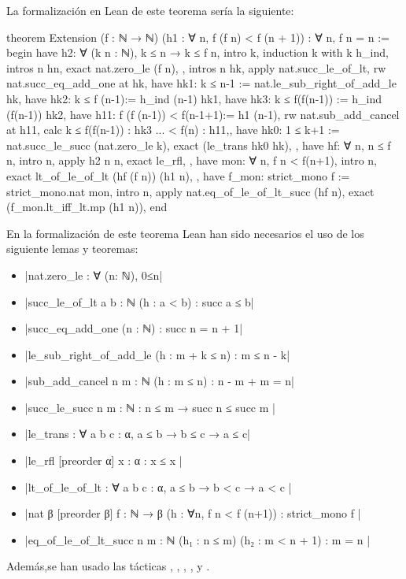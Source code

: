 La formalización en Lean de este teorema sería la siguiente:
\begin{leancode}
theorem Extension
  (f : ℕ → ℕ)
  (h1 : ∀ n, f (f n) < f (n + 1))
  : ∀ n, f n = n :=
begin
  have h2: ∀ (k n : ℕ), k ≤ n → k ≤ f n,
  { intro k,
     induction k with k h_ind,
     { intros n hn,
       exact nat.zero_le (f n), },
     { intros n hk,
       apply nat.succ_le_of_lt,
       rw nat.succ_eq_add_one at hk,
       have hk1: k ≤ n-1 := nat.le_sub_right_of_add_le hk,
       have hk2: k ≤ f (n-1):= h_ind (n-1) hk1,
       have hk3: k ≤ f(f(n-1)) := h_ind (f(n-1)) hk2,
       have h11: f (f (n-1)) < f(n-1+1):= h1 (n-1),
       rw nat.sub_add_cancel at h11,
       { calc k ≤ f(f(n-1)) : hk3
            ... < f(n)      : h11,},
       have hk0: 1 ≤ k+1 := nat.succ_le_succ (nat.zero_le k),
       exact (le_trans hk0 hk), }},
  have hf: ∀ n, n ≤ f n,
    { intro n,
      apply h2 n n,
      exact le_rfl, },
  have mon: ∀ n, f n < f(n+1),
    { intro n,
      exact lt_of_le_of_lt (hf (f n)) (h1 n), },
  have f_mon: strict_mono f := strict_mono.nat mon,
  intro n,
  apply nat.eq_of_le_of_lt_succ (hf n),
  exact (f_mon.lt_iff_lt.mp (h1 n)),
end
\end{leancode}

En la formalización de este teorema Lean han sido necesarios el uso
de los siguiente lemas y teoremas:
\begin{itemize}
\item {}|nat.zero_le : ∀ (n: ℕ), 0≤n|
\item {}|succ_le_of_lt {a b : ℕ} (h : a < b) : succ a ≤ b|
\item {}|succ_eq_add_one (n : ℕ) : succ n = n + 1|
\item {}|le_sub_right_of_add_le (h : m + k ≤ n) : m ≤ n - k|
\item {}|sub_add_cancel {n m : ℕ} (h : m ≤ n) : n - m + m = n|
\item {}|succ_le_succ {n m : ℕ} : n ≤ m → succ n ≤ succ m |
\item {}|le_trans : ∀ {a b c : α}, a ≤ b → b ≤ c → a ≤ c|
\item {}|le_rfl [preorder α] {x : α} : x ≤ x |
\item {}|lt_of_le_of_lt : ∀ {a b c : α}, a ≤ b → b < c → a < c |
\item {}|nat {β} [preorder β] {f : ℕ → β} (h : ∀n, f n < f (n+1)) :  strict_mono f |
\item {}|eq_of_le_of_lt_succ {n m : ℕ} (h₁ : n ≤ m) (h₂ : m < n + 1) : m = n |
\end{itemize}
Además,se han usado las tácticas
,
,
,
,
 y
.

